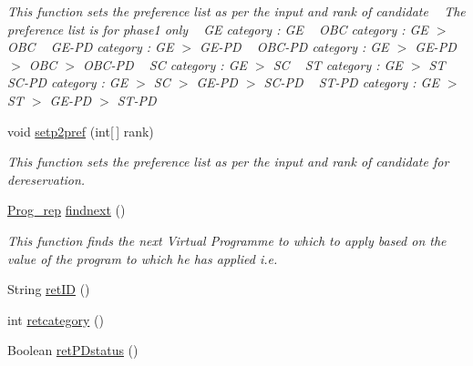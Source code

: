\begin{DoxyCompactItemize}
\begin{DoxyCompactList}\small\item\em This function sets the preference list as per the input and rank of candidate ~\newline
 The preference list is for phase1 only ~\newline
 G\+E category \+: G\+E ~\newline
 O\+B\+C category \+: G\+E $>$ O\+B\+C ~\newline
 G\+E-\/\+P\+D category \+: G\+E $>$ G\+E-\/\+P\+D ~\newline
 O\+B\+C-\/\+P\+D category \+: G\+E $>$ G\+E-\/\+P\+D $>$ O\+B\+C $>$ O\+B\+C-\/\+P\+D ~\newline
 S\+C category \+: G\+E $>$ S\+C ~\newline
 S\+T category \+: G\+E $>$ S\+T ~\newline
 S\+C-\/\+P\+D category \+: G\+E $>$ S\+C $>$ G\+E-\/\+P\+D $>$ S\+C-\/\+P\+D ~\newline
 S\+T-\/\+P\+D category \+: G\+E $>$ S\+T $>$ G\+E-\/\+P\+D $>$ S\+T-\/\+P\+D ~\newline
 \end{DoxyCompactList}\item 
void \hyperlink{classalgo1_1_1Candidate_a3bd0ce5091bea5e9aa4012b5b749f08f}{setp2pref} (int\mbox{[}$\,$\mbox{]} rank)
\begin{DoxyCompactList}\small\item\em This function sets the preference list as per the input and rank of candidate for dereservation. \end{DoxyCompactList}\item 
\hyperlink{classalgo1_1_1Candidate_1_1Prog__rep}{Prog\+\_\+rep} \hyperlink{classalgo1_1_1Candidate_a843ccd1bb912db699272e72ee12d08c3}{findnext} ()
\begin{DoxyCompactList}\small\item\em This function finds the next Virtual Programme to which to apply based on the value of the program to which he has applied i.\+e. \end{DoxyCompactList}\item 
String \hyperlink{classalgo1_1_1Candidate_ac85b7df6847dfa8b28b452bdc8f21194}{ret\+I\+D} ()
\item 
int \hyperlink{classalgo1_1_1Candidate_a3f72d7498999e22862c95a8905dd7948}{retcategory} ()
\item 
Boolean \hyperlink{classalgo1_1_1Candidate_a49d557fa291b974e69dd16ac74ab2117}{ret\+P\+Dstatus} ()
\item 

\end{DoxyCompactItemize}
